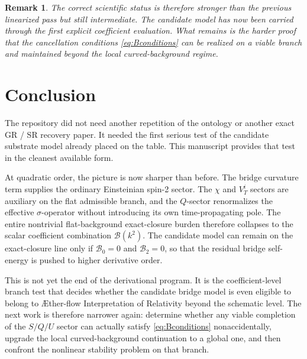 \documentclass[11pt]{article}
\newcommand{\Aflow}{\AE{}ther-flow}
\newcommand{\TheoryName}{\Aflow{} Interpretation of Relativity}
\newtheorem{remark}{Remark}
\begin{document}
\begin{remark}
The correct scientific status is therefore stronger than the previous linearized pass but still intermediate. The candidate model has now been carried through the first explicit coefficient evaluation. What remains is the harder proof that the cancellation conditions \eqref{eq:Bconditions} can be realized on a viable branch and maintained beyond the local curved-background regime.
\end{remark}

\section{Conclusion}

The repository did not need another repetition of the ontology or another exact GR / SR recovery paper. It needed the first serious test of the candidate substrate model already placed on the table. This manuscript provides that test in the cleanest available form.

At quadratic order, the picture is now sharper than before. The bridge curvature term supplies the ordinary Einsteinian spin-2 sector. The \(\chi\) and \(V_T^i\) sectors are auxiliary on the flat admissible branch, and the \(Q\)-sector renormalizes the effective \(\sigma\)-operator without introducing its own time-propagating pole. The entire nontrivial flat-background exact-closure burden therefore collapses to the scalar coefficient combination \(\mathcal B(k^2)\). The candidate model can remain on the exact-closure line only if \(\mathcal B_0=0\) and \(\mathcal B_2=0\), so that the residual bridge self-energy is pushed to higher derivative order.

This is not yet the end of the derivational program. It is the coefficient-level branch test that decides whether the candidate bridge model is even eligible to belong to \TheoryName{} beyond the schematic level. The next work is therefore narrower again: determine whether any viable completion of the \(S/Q/U\) sector can actually satisfy \eqref{eq:Bconditions} nonaccidentally, upgrade the local curved-background continuation to a global one, and then confront the nonlinear stability problem on that branch.
\end{document}
